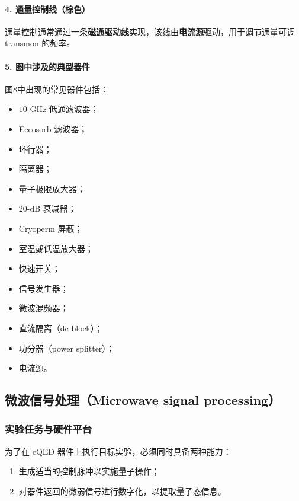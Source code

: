 \documentclass[12pt,a4paper,oneside]{ctexbook}
\begin{document}
\paragraph{4. 通量控制线（棕色）}

通量控制通常通过一条\textbf{磁通驱动线}实现，该线由\textbf{电流源}驱动，用于调节通量可调 transmon 的频率。

\paragraph{5. 图中涉及的典型器件}

图8中出现的常见器件包括：

\begin{itemize}
    \item $10$-GHz 低通滤波器；
    \item Eccosorb 滤波器；
    \item 环行器；
    \item 隔离器；
    \item 量子极限放大器；
    \item $20$-dB 衰减器；
    \item Cryoperm 屏蔽；
    \item 室温或低温放大器；
    \item 快速开关；
    \item 信号发生器；
    \item 微波混频器；
    \item 直流隔离（dc block）；
    \item 功分器（power splitter）；
    \item 电流源。
\end{itemize}

\subsection{微波信号处理（Microwave signal processing）}

\subsubsection{实验任务与硬件平台}

为了在 cQED 器件上执行目标实验，必须同时具备两种能力：

\begin{enumerate}
    \item 生成适当的控制脉冲以实施量子操作；
    \item 对器件返回的微弱信号进行数字化，以提取量子态信息。
\end{enumerate}
\end{document}

